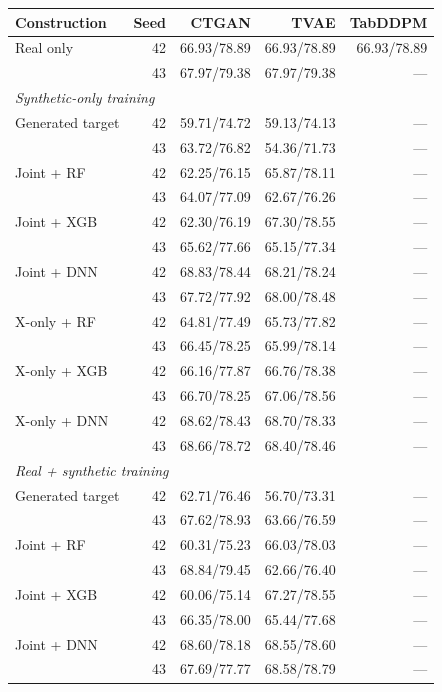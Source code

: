 \begin{table}[ht]
\centering
{\small
\setlength{\tabcolsep}{2pt}
\begin{tabular}{lrrrr}
\toprule
Construction & Seed & CTGAN & TVAE & TabDDPM \\
\midrule
Real only & 42 & 66.93/78.89 & 66.93/78.89 & 66.93/78.89 \\
 & 43 & 67.97/79.38 & 67.97/79.38 & --- \\
\midrule
\multicolumn{5}{l}{\textit{Synthetic-only training}} \\
Generated target & 42 & 59.71/74.72 & 59.13/74.13 & --- \\
 & 43 & 63.72/76.82 & 54.36/71.73 & --- \\
Joint + RF & 42 & 62.25/76.15 & 65.87/78.11 & --- \\
 & 43 & 64.07/77.09 & 62.67/76.26 & --- \\
Joint + XGB & 42 & 62.30/76.19 & 67.30/78.55 & --- \\
 & 43 & 65.62/77.66 & 65.15/77.34 & --- \\
Joint + DNN & 42 & 68.83/78.44 & 68.21/78.24 & --- \\
 & 43 & 67.72/77.92 & 68.00/78.48 & --- \\
X-only + RF & 42 & 64.81/77.49 & 65.73/77.82 & --- \\
 & 43 & 66.45/78.25 & 65.99/78.14 & --- \\
X-only + XGB & 42 & 66.16/77.87 & 66.76/78.38 & --- \\
 & 43 & 66.70/78.25 & 67.06/78.56 & --- \\
X-only + DNN & 42 & 68.62/78.43 & 68.70/78.33 & --- \\
 & 43 & 68.66/78.72 & 68.40/78.46 & --- \\
\midrule
\multicolumn{5}{l}{\textit{Real + synthetic training}} \\
Generated target & 42 & 62.71/76.46 & 56.70/73.31 & --- \\
 & 43 & 67.62/78.93 & 63.66/76.59 & --- \\
Joint + RF & 42 & 60.31/75.23 & 66.03/78.03 & --- \\
 & 43 & 68.84/79.45 & 62.66/76.40 & --- \\
Joint + XGB & 42 & 60.06/75.14 & 67.27/78.55 & --- \\
 & 43 & 66.35/78.00 & 65.44/77.68 & --- \\
Joint + DNN & 42 & 68.60/78.18 & 68.55/78.60 & --- \\
 & 43 & 67.69/77.77 & 68.58/78.79 & --- \\

\end{tabular}}
\end{table}
